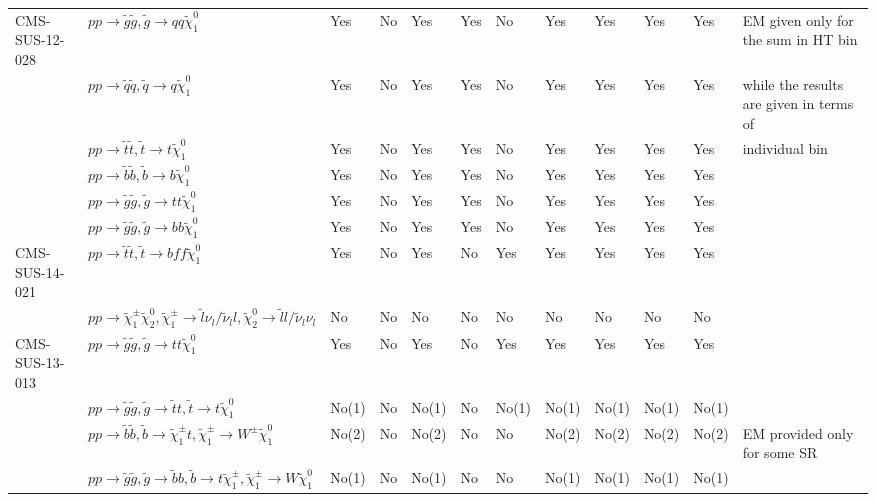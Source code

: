 \documentclass[11pt,A4paper]{article}
\begin{document}
\begin{landscape}
\begin{longtable} {|l|l|l|l|l|l|l|l|l|l|l|l|}
CMS-SUS-12-028 & $pp \rightarrow \tilde{g} \tilde{g}, \tilde{g}\rightarrow q q  \tilde{\chi}_1 ^0 $ & Yes & No & Yes & Yes & No & Yes & Yes & Yes & Yes & EM given only for the sum in HT bin\\
 & $pp \rightarrow \tilde{q} \tilde{q}, \tilde{q}\rightarrow q  \tilde{\chi}_1 ^0 $ & Yes & No & Yes & Yes & No & Yes & Yes & Yes & Yes & while the results are given in terms of\\
 & $pp \rightarrow \tilde{t} \tilde{t}, \tilde{t}\rightarrow t  \tilde{\chi}_1 ^0 $ & Yes & No & Yes & Yes & No & Yes & Yes & Yes & Yes & individual bin\\
 & $pp \rightarrow \tilde{b} \tilde{b}, \tilde{b}\rightarrow b  \tilde{\chi}_1 ^0 $ & Yes & No & Yes & Yes & No & Yes & Yes & Yes & Yes & \\
 & $pp \rightarrow \tilde{g} \tilde{g}, \tilde{g}\rightarrow t  t  \tilde{\chi}_1 ^0 $ & Yes & No & Yes & Yes & No & Yes & Yes & Yes & Yes & \\
  & $pp \rightarrow \tilde{g} \tilde{g}, \tilde{g} \rightarrow b  b \tilde{\chi}_1 ^0 $ & Yes & No & Yes & Yes & No & Yes & Yes & Yes & Yes & \\ \hline
CMS-SUS-14-021 & $pp \rightarrow \tilde{t} \tilde{t}, \tilde{t} \rightarrow b  f f\tilde{\chi}_1 ^0 $ & Yes & No & Yes & No & Yes & Yes & Yes & Yes & Yes & \\
  & $pp \rightarrow \tilde{\chi}_1 ^{\pm} \tilde{\chi}_2 ^0 , \tilde{\chi}_1 ^{\pm} \rightarrow \tilde{l} \nu_{l}  / \tilde{\nu}_{l} l , \tilde{\chi}_2 ^0 \rightarrow \tilde{l }l   / \tilde{\nu}_{l} \nu_{l}$ & No & No & No & No & No & No & No & No & No & \\ \hline
CMS-SUS-13-013 & $pp \rightarrow \tilde{g} \tilde{g}, \tilde{g}\rightarrow t  t  \tilde{\chi}_1 ^0 $ & Yes & No & Yes & No & Yes & Yes & Yes & Yes & Yes & \\
 & $pp \rightarrow \tilde{g} \tilde{g}, \tilde{g}\rightarrow \tilde{t} t,\tilde{t}\rightarrow t \tilde{\chi}_1 ^0$ & No(1) & No & No(1) & No & No(1) & No(1) & No(1) & No(1) & No(1) & \\
 & $pp \rightarrow \tilde{b} \tilde{b}, \tilde{b}\rightarrow \tilde{\chi}_1 ^{\pm} t,\tilde{\chi}_1 ^{\pm} \rightarrow W^{\pm} \tilde{\chi}_1 ^0$ & No(2) & No & No(2) & No & No & No(2) & No(2) & No(2) & No(2) & EM provided only for some SR\\
 & $pp \rightarrow \tilde{g} \tilde{g}, \tilde{g}\rightarrow \tilde{b} b,\tilde{b}\rightarrow t \tilde{\chi}_1 ^{\pm} , \tilde{\chi}_1 ^{\pm} \rightarrow W \tilde{\chi}_1 ^0 $ & No(1) & No & No(1) & No & No & No(1) & No(1) & No(1) & No(1) & \\

\end{longtable}
\end{landscape}
\end{document}
